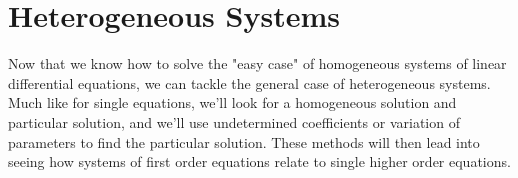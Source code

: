 \section{Heterogeneous Systems}
\noindent
Now that we know how to solve the "easy case" of homogeneous systems of linear differential equations, we can tackle the general case of heterogeneous systems. Much like for single equations, we'll look for a homogeneous solution and particular solution, and we'll use undetermined coefficients or variation of parameters to find the particular solution. These methods will then lead into seeing how systems of first order equations relate to single higher order equations.


